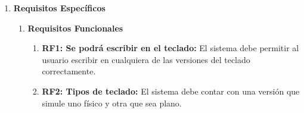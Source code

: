 \begin{enumerate}
	\begin{enumerate}
		
		\item \textbf{Perspectiva del Producto:} El sistema consistirá en un teclado virtual que simule uno físico y uno plano en un entorno de realidad virtual (VR). Los usuarios podrán cambiar estos teclados y seleccionar el idioma deseado para la entrada de texto.
		
		\item \textbf{Funciones del Producto:} El teclado virtual permitirá:
		
		\begin{itemize}
			
			\item Cambiar entre teclado físico y plano.
			
			\item Seleccionar entre siete idiomas disponibles.
			
			\item Escribir correctamente en cualquiera de los idiomas.
			
			\item Funcionar tanto con mando como con hand tracking.
			
		\end{itemize}
		
		\item \textbf{Características del Usuario:} Los usuarios serán principalmente aquellos que desarrollen aplicaciones de realidad virtual en las que se requiera la entrada de texto, como aplicaciones educativas y de entretenimiento.
		
	\end{enumerate}
	
	\item \textbf{Requisitos Específicos}
	
	\begin{enumerate}
		
		\item \textbf{Requisitos Funcionales}
		
		\begin{enumerate}
			
			\item \textbf{RF1: Se podrá escribir en el teclado:} El sistema debe permitir al usuario escribir en cualquiera de las versiones del teclado correctamente.
			
			\item \textbf{RF2: Tipos de teclado:} El sistema debe contar con una versión que simule uno físico y otra que sea plano.
			

\end{enumerate}
\end{enumerate}
\end{enumerate}
